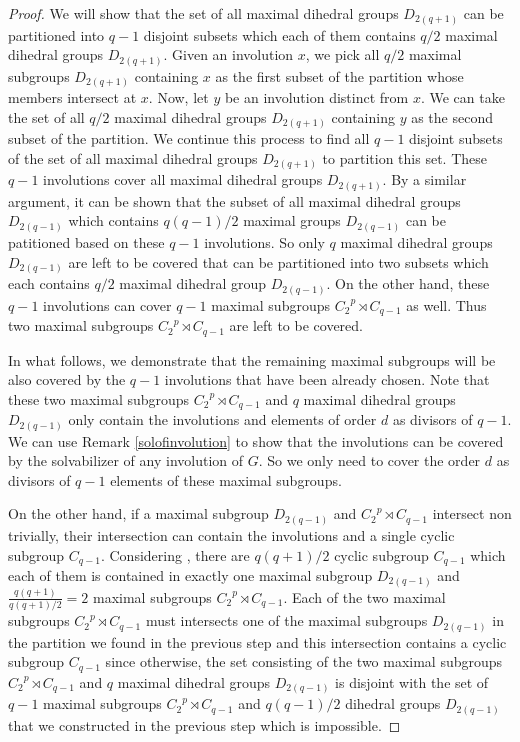 \documentclass{amsart}
\theoremstyle{definition}
\theoremstyle{remark}
\begin{document}
\begin{proof}
We will show that the set of all maximal dihedral groups $D_{2(q+1)}$ can be partitioned into $q-1$ disjoint subsets which each of them contains $q/2$ maximal dihedral groups $D_{2(q+1)}$. Given an involution $x$, we pick all $q/2$ maximal subgroups $D_{2(q+1)}$ containing $x$ as the first subset of the partition whose members intersect at $x$. Now, let $y$  be an involution distinct from $x$. We can take the set of all $q/2$ maximal dihedral groups $D_{2(q+1)}$ containing $y$ as the second subset of the partition. We continue this process to find all $q-1$ disjoint subsets of the set of all maximal dihedral groups $D_{2(q+1)}$ to partition this set. These $q-1$ involutions cover all maximal dihedral groups $D_{2(q+1)}$. By a similar argument, it can be shown that the subset of all maximal dihedral groups $D_{2(q-1)}$ which contains $q(q-1)/2$ maximal groups $D_{2(q-1)}$ can be patitioned based on these $q-1$ involutions. So only $q$ maximal dihedral groups $D_{2(q-1)}$ are left to be covered that can be partitioned into two subsets which each contains $q/2$ maximal dihedral group $D_{2(q-1)}$. On the other hand, these $q-1$ involutions can cover $q-1$ maximal subgroups ${C_2}^p\rtimes C_{q-1}$ as well. Thus two maximal subgroups ${C_2}^p\rtimes C_{q-1}$ are left to be covered. 

In what follows, we demonstrate that the remaining maximal subgroups will be also covered by the $q-1$ involutions that have been already chosen. Note that these two maximal subgroups ${C_2}^p\rtimes C_{q-1}$ and $q$ maximal dihedral groups $D_{2(q-1)}$ only contain the involutions and elements of order $d$ as divisors of $q-1$. We can use Remark \ref{solofinvolution} to show that the involutions can be covered by the solvabilizer of any involution of $G$. So we only need to cover the order $d$ as divisors of $q-1$ elements of these maximal subgroups.

On the other hand, if a maximal subgroup $D_{2(q-1)}$ and ${C_2}^p\rtimes C_{q-1}$ intersect non trivially,  their intersection can contain the involutions and a single cyclic subgroup $C_{q-1}$. 
Considering \cite[Theorem 2.1]{King}, there are $q(q+1)/2$ cyclic subgroup $C_{q-1}$ which each of them is contained in exactly one maximal subgroup $D_{2(q-1)}$ and $\frac{q(q+1)}{q(q+1)/2}=2$  maximal subgroups ${C_2}^p\rtimes C_{q-1}$. Each of the two maximal subgroups ${C_2}^p\rtimes C_{q-1}$ must intersects one of the maximal subgroups $D_{2(q-1)}$ in the partition we found in the previous step and this intersection contains a cyclic subgroup $C_{q-1}$ since otherwise, the set consisting of the two maximal subgroups ${C_2}^p\rtimes C_{q-1}$ and $q$ maximal dihedral groups $D_{2(q-1)}$ is disjoint with the set of $q-1$ maximal subgroups ${C_2}^p\rtimes C_{q-1}$ and $q(q-1)/2$ dihedral groups $D_{2(q-1)}$ that we constructed in the previous step which is impossible.


\end{proof}
\end{document}
